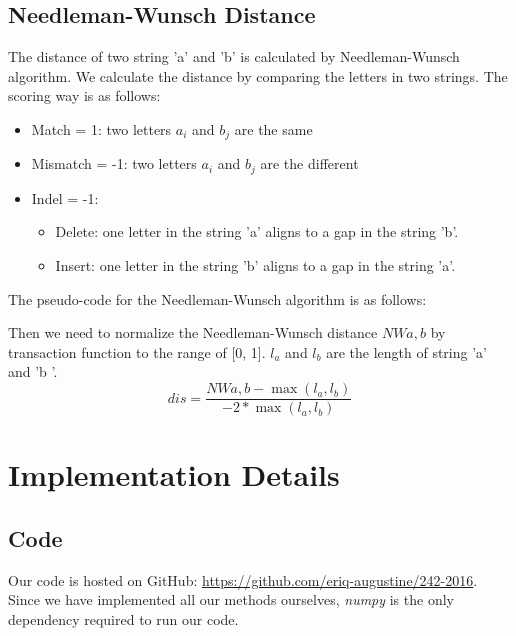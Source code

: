 \documentclass{article}
\begin{document}
\subsection{Needleman-Wunsch Distance}
The distance of two string 'a' and 'b' is calculated by Needleman-Wunsch algorithm. We calculate the distance by comparing the letters in two strings. The scoring way is as follows:
\begin{itemize}
  \item  Match = 1: two letters $a_{i}$ and $b_{j}$ are the same 
  \item  Mismatch = -1: two letters $a_{i}$ and $b_{j}$ are the different 
  \item  Indel = -1:
  \begin{itemize}
  	\item Delete: one letter in the string 'a' aligns to a gap in the string 'b'.
    \item Insert: one letter in the string 'b' aligns to a gap in the string 'a'.
  \end{itemize}
  		
\end{itemize}

The pseudo-code for the Needleman-Wunsch algorithm is as follows:

\begin{algorithmic}
\ENDFOR
{}
\ENDFOR
{}
\ENDFOR
\end{algorithmic}
Then we need to normalize the Needleman-Wunsch distance $NW{a,b}$ by transaction function to the range of [0, 1]. $l_{a}$ and $l_{b}$ are the length of string 'a' and 'b '.
$$dis = \frac{NW{a,b} - {\max}(l_{a}, l_{b})}{-2 * {\max}(l_{a}, l_{b})}  $$

\section{Implementation Details}
\subsection{Code}
Our code is hosted on GitHub: \href{https://github.com/eriq-augustine/242-2016}{https://github.com/eriq-augustine/242-2016}.
Since we have implemented all our methods ourselves, \textit{numpy} is the only dependency required to run our code.
\end{document}
